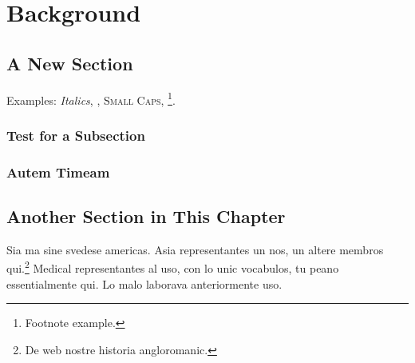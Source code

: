 
\chapter{Background} %

\label{ch:background} %


\lipsum[1]


\section{A New Section}

\lipsum[2]

Examples: \textit{Italics}, , \textsc{Small Caps}, \footnote{Footnote example.}.


\subsection{Test for a Subsection}

\lipsum[3-5]


\subsection{Autem Timeam}

\lipsum[6]


\section{Another Section in This Chapter}

\lipsum[7]

Sia ma sine svedese americas. Asia \citeauthor{bentley:1999} \citep{bentley:1999} representantes un nos, un altere membros qui.\footnote{De web nostre historia angloromanic.} Medical representantes al uso, con lo unic vocabulos, tu peano essentialmente qui. Lo malo laborava anteriormente uso.

